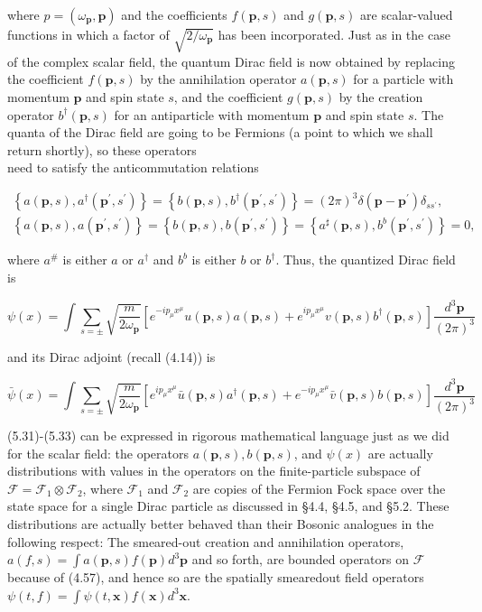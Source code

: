 \documentclass[10pt, letterpaper]{article}
\begin{document}
where $p=\left(\omega_{\mathbf{p}}, \mathbf{p}\right)$ and the coefficients $f(\mathbf{p}, s)$ and $g(\mathbf{p}, s)$ are scalar-valued functions in which a factor of $\sqrt{2 / \omega_{\mathbf{p}}}$ has been incorporated. Just as in the case of the complex scalar field, the quantum Dirac field is now obtained by replacing the coefficient $f(\mathbf{p}, s)$ by the annihilation operator $a(\mathbf{p}, s)$ for a particle with momentum $\mathbf{p}$ and spin state $s$, and the coefficient $g(\mathbf{p}, s)$ by the creation operator $b^{\dagger}(\mathbf{p}, s)$ for an antiparticle with momentum $\mathbf{p}$ and spin state $s$. The quanta of the Dirac field are going to be Fermions (a point to which we shall return shortly), so these operators\\
need to satisfy the anticommutation relations

$$
\begin{gathered}
\left\{a(\mathbf{p}, s), a^{\dagger}\left(\mathbf{p}^{\prime}, s^{\prime}\right)\right\}=\left\{b(\mathbf{p}, s), b^{\dagger}\left(\mathbf{p}^{\prime}, s^{\prime}\right)\right\}=(2 \pi)^{3} \delta\left(\mathbf{p}-\mathbf{p}^{\prime}\right) \delta_{s s^{\prime}}, \\
\left\{a(\mathbf{p}, s), a\left(\mathbf{p}^{\prime}, s^{\prime}\right)\right\}=\left\{b(\mathbf{p}, s), b\left(\mathbf{p}^{\prime}, s^{\prime}\right)\right\}=\left\{a^{\sharp}(\mathbf{p}, s), b^{b}\left(\mathbf{p}^{\prime}, s^{\prime}\right)\right\}=0,
\end{gathered}
$$

where $a^{\#}$ is either $a$ or $a^{\dagger}$ and $b^{b}$ is either $b$ or $b^{\dagger}$. Thus, the quantized Dirac field is

$$
\psi(x)=\int \sum_{s= \pm} \sqrt{\frac{m}{2 \omega_{\mathbf{p}}}}\left[e^{-i p_{\mu} x^{\mu}} u(\mathbf{p}, s) a(\mathbf{p}, s)+e^{i p_{\mu} x^{\mu}} v(\mathbf{p}, s) b^{\dagger}(\mathbf{p}, s)\right] \frac{d^{3} \mathbf{p}}{(2 \pi)^{3}}
$$

and its Dirac adjoint (recall (4.14)) is

$$
\bar{\psi}(x)=\int \sum_{s= \pm} \sqrt{\frac{m}{2 \omega_{\mathbf{p}}}}\left[e^{i p_{\mu} x^{\mu}} \bar{u}(\mathbf{p}, s) a^{\dagger}(\mathbf{p}, s)+e^{-i p_{\mu} x^{\mu}} \bar{v}(\mathbf{p}, s) b(\mathbf{p}, s)\right] \frac{d^{3} \mathbf{p}}{(2 \pi)^{3}}
$$

(5.31)-(5.33) can be expressed in rigorous mathematical language just as we did for the scalar field: the operators $a(\mathbf{p}, s), b(\mathbf{p}, s)$, and $\psi(x)$ are actually distributions with values in the operators on the finite-particle subspace of $\mathcal{F}=\mathcal{F}_{1} \otimes \mathcal{F}_{2}$, where $\mathcal{F}_{1}$ and $\mathcal{F}_{2}$ are copies of the Fermion Fock space over the state space for a single Dirac particle as discussed in §4.4, §4.5, and §5.2. These distributions are actually better behaved than their Bosonic analogues in the following respect: The smeared-out creation and annihilation operators, $a(f, s)=\int a(\mathbf{p}, s) f(\mathbf{p}) d^{3} \mathbf{p}$ and so forth, are bounded operators on $\mathcal{F}$ because of (4.57), and hence so are the spatially smearedout field operators $\psi(t, f)=\int \psi(t, \mathbf{x}) f(\mathbf{x}) d^{3} \mathbf{x}$.
\end{document}
